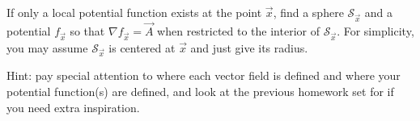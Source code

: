 \documentclass[letter]{article}
\begin{document}
\begin{enumerate}
\begin{enumerate}
					If only a local potential function exists at the point $\vec x$, find a
					sphere $\mathcal S_{\vec x}$ and a 
					potential $f_{\vec x}$ so that $\nabla f_{\vec x} = \vec A$ when restricted to the interior
					of $\mathcal S_{\vec x}$.  For simplicity, you may assume $\mathcal S_{\vec x}$ is centered at $\vec x$
					and just give its radius.
					
					Hint: pay special attention to where each vector field is defined and 
					where your potential function(s) are defined, and look at the previous homework set for if you need extra
					inspiration.

			\end{enumerate}
	\end{enumerate}
\end{document}
